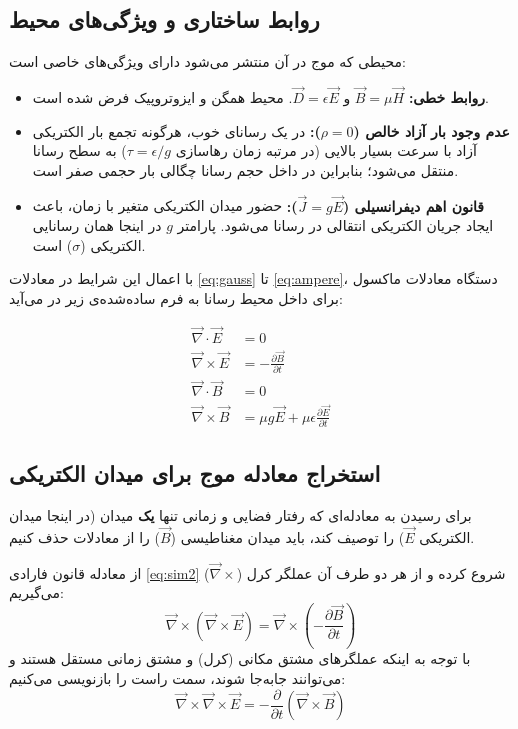 \documentclass[12pt,a4paper]{article}
\begin{document}
\subsection*{روابط ساختاری و ویژگی‌های محیط}
محیطی که موج در آن منتشر می‌شود دارای ویژگی‌های خاصی است:
\begin{itemize}
	\item \textbf{روابط خطی:} $\vec{B} = \mu\vec{H}$ و $\vec{D} = \epsilon\vec{E}$. محیط همگن و ایزوتروپیک فرض شده است.
	\item \textbf{عدم وجود بار آزاد خالص ($\rho = 0$):} در یک رسانای خوب، هرگونه تجمع بار الکتریکی آزاد با سرعت بسیار بالایی (در مرتبه زمان رهاسازی $\tau = \epsilon/g$) به سطح رسانا منتقل می‌شود؛ بنابراین در داخل حجم رسانا چگالی بار حجمی صفر است.
	\item \textbf{قانون اهم دیفرانسیلی ($\vec{J} = g\vec{E}$):} حضور میدان الکتریکی متغیر با زمان، باعث ایجاد جریان الکتریکی انتقالی در رسانا می‌شود. پارامتر $g$ در اینجا همان رسانایی الکتریکی ($\sigma$) است.
\end{itemize}

با اعمال این شرایط در معادلات \eqref{eq:gauss} تا \eqref{eq:ampere}، دستگاه معادلات ماکسول برای داخل محیط رسانا به فرم ساده‌شده‌ی زیر در می‌آید:

\begin{align}
	\vec{\nabla} \cdot \vec{E} &= 0 \label{eq:sim1} \\
	\vec{\nabla} \times \vec{E} &= -\frac{\partial \vec{B}}{\partial t} \label{eq:sim2} \\
	\vec{\nabla} \cdot \vec{B} &= 0 \label{eq:sim3} \\
	\vec{\nabla} \times \vec{B} &= \mu g \vec{E} + \mu \epsilon \frac{\partial \vec{E}}{\partial t} \label{eq:sim4}
\end{align}

\subsection{استخراج معادله موج برای میدان الکتریکی}
برای رسیدن به معادله‌ای که رفتار فضایی و زمانی تنها \textbf{یک} میدان (در اینجا میدان الکتریکی $\vec{E}$) را توصیف کند، باید میدان مغناطیسی ($\vec{B}$) را از معادلات حذف کنیم.

از معادله قانون فارادی \eqref{eq:sim2} شروع کرده و از هر دو طرف آن عملگر کرل ($\vec{\nabla} \times$) می‌گیریم:
\begin{equation}
	\vec{\nabla} \times (\vec{\nabla} \times \vec{E}) = \vec{\nabla} \times \left( -\frac{\partial \vec{B}}{\partial t} \right)
\end{equation}
با توجه به اینکه عملگرهای مشتق مکانی (کرل) و مشتق زمانی مستقل هستند و می‌توانند جابه‌جا شوند، سمت راست را بازنویسی می‌کنیم:
\begin{equation} \label{eq:curl_curl}
	\vec{\nabla} \times \vec{\nabla} \times \vec{E} = -\frac{\partial}{\partial t} (\vec{\nabla} \times \vec{B})
\end{equation}
\end{document}
